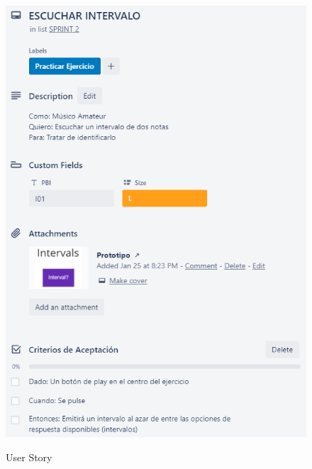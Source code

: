 \documentclass[12pt,twoside,titlepage]{report}
\begin{document}
{\begin{figure}[H]
    \centering
    \includegraphics[scale=1.3]{Scrum/User Stories/Intervalos}
    \label{fig:Intervalos}
    \caption{User Story}
\end{figure}

}
\end{document}
